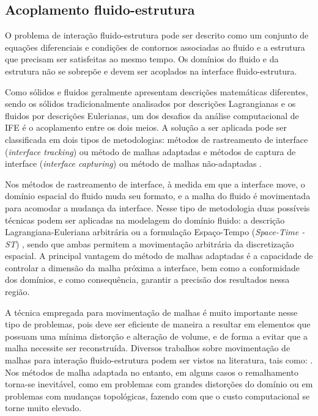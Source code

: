 \documentclass[tese_patricia.tex]{subfiles}
\begin{document}
\subsection{Acoplamento fluido-estrutura}
\label{couplingsection}


O problema de interação fluido-estrutura pode ser descrito como um conjunto de equações diferenciais e condições de contornos associadas ao fluido e a estrutura que precisam ser satisfeitas ao mesmo tempo. Os domínios do fluido e da estrutura não se sobrepõe e devem ser acoplados na interface fluido-estrutura. 

Como sólidos e fluidos geralmente apresentam descrições matemáticas diferentes, sendo os sólidos tradicionalmente analisados por descrições Lagrangianas e os fluidos por descrições Eulerianas, um dos desafios da análise computacional de IFE é o acoplamento entre os dois meios. A solução a ser aplicada pode ser classificada em dois tipos de metodologias: métodos de rastreamento de interface (\textit{interface tracking}) ou método de malhas adaptadas e métodos de captura de interface (\textit{interface capturing}) ou método de malhas não-adaptadas \cite{Houetal:2012,BazilevsTT:2013b}.

Nos métodos de rastreamento de interface, à medida em que a interface move, o domínio espacial do fluido muda seu formato, e a malha do fluido é movimentada para acomodar a mudança da interface. Nesse tipo de metodologia duas possíveis técnicas podem ser aplicadas na modelagem do domínio fluido: a descrição Lagrangiana-Euleriana arbitrária \cite{HughesLZ:1981,DoneaGH:1982,BazilevsCZH:2006a} ou a formulação Espaço-Tempo (\textit{Space-Time - ST}) \cite{TezduyarBML:1992b,TezduyarBL:1992c,TakizawaT:2012}, sendo que ambas permitem a movimentação arbitrária da discretização espacial. A principal vantagem do método de malhas adaptadas é a capacidade de controlar a dimensão da malha próxima a interface, bem como a conformidade dos domínios, e como consequência, garantir a precisão dos resultados nessa região.

A técnica empregada para movimentação de malhas é muito importante nesse tipo de problemas, pois deve ser eficiente de maneira a resultar em elementos que possuam uma mínima distorção e alteração de volume, e de forma a evitar que a malha necessite ser reconstruída. Diversos trabalhos sobre movimentação de malhas para interação fluido-estrutura podem ser vistos na literatura, tais como: . Nos métodos de malha adaptada no entanto, em alguns casos o remalhamento torna-se inevitável, como em problemas com grandes distorções do domínio ou em problemas com mudanças topológicas, fazendo com que o custo computacional se torne muito elevado.
\end{document}
